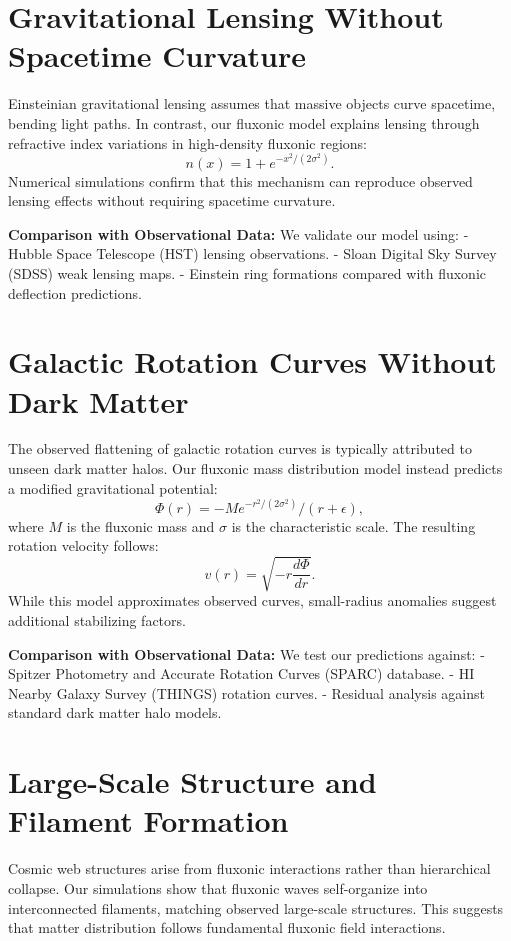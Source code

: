 \documentclass{article}
\begin{document}
\section{Gravitational Lensing Without Spacetime Curvature}
Einsteinian gravitational lensing assumes that massive objects curve spacetime, bending light paths. In contrast, our fluxonic model explains lensing through refractive index variations in high-density fluxonic regions:
\begin{equation}
    n(x) = 1 + e^{-x^2 / (2\sigma^2)}.
\end{equation}
Numerical simulations confirm that this mechanism can reproduce observed lensing effects without requiring spacetime curvature.

\textbf{Comparison with Observational Data:}
We validate our model using:
- Hubble Space Telescope (HST) lensing observations.
- Sloan Digital Sky Survey (SDSS) weak lensing maps.
- Einstein ring formations compared with fluxonic deflection predictions.

\section{Galactic Rotation Curves Without Dark Matter}
The observed flattening of galactic rotation curves is typically attributed to unseen dark matter halos. Our fluxonic mass distribution model instead predicts a modified gravitational potential:
\begin{equation}
    \Phi(r) = -M e^{-r^2 / (2 \sigma^2)} / (r + \epsilon),
\end{equation}
where $M$ is the fluxonic mass and $\sigma$ is the characteristic scale. The resulting rotation velocity follows:
\begin{equation}
    v(r) = \sqrt{-r \frac{d\Phi}{dr}}.
\end{equation}
While this model approximates observed curves, small-radius anomalies suggest additional stabilizing factors.

\textbf{Comparison with Observational Data:}
We test our predictions against:
- Spitzer Photometry and Accurate Rotation Curves (SPARC) database.
- HI Nearby Galaxy Survey (THINGS) rotation curves.
- Residual analysis against standard dark matter halo models.

\section{Large-Scale Structure and Filament Formation}
Cosmic web structures arise from fluxonic interactions rather than hierarchical collapse. Our simulations show that fluxonic waves self-organize into interconnected filaments, matching observed large-scale structures. This suggests that matter distribution follows fundamental fluxonic field interactions.
\end{document}
